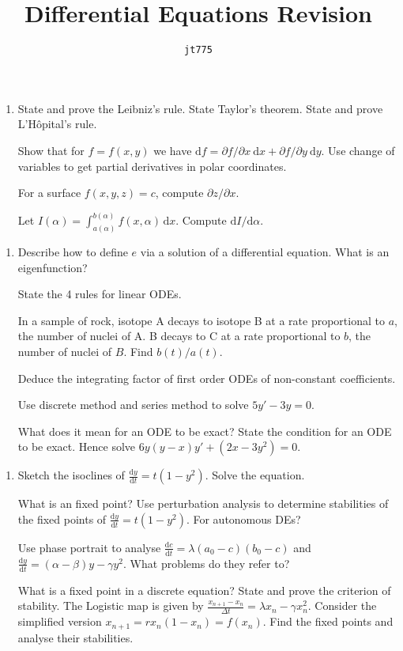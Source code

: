 \documentclass[11pt]{article}
\title{\textbf{Differential Equations Revision}}
\author{\texttt{jt775}}
\date{\null}
\newcommand{\rmd}{\mathrm{d}}
\newlength{\qspace}
\newcounter{qnumber}
\newenvironment{question}%
 {\vspace{\qspace}
  \begin{enumerate}[\bfseries 1\quad][10]%
    \setcounter{enumi}{\value{qnumber}}%
    \item%
 }
{
  \end{enumerate}
  \filbreak
  \stepcounter{qnumber}
 }
\begin{document}
\maketitle
\vspace{-1.5cm}
\begin{question}
    State and prove the Leibniz's rule. State Taylor's theorem. State and prove L'H\^{o}pital's rule.

    Show that for $ f=f(x,y) $ we have $ \rmd f=\partial f/\partial x\ \rmd x+\partial f/\partial y\ \rmd y  $. Use change of variables to get partial derivatives in polar coordinates.

    For a surface $ f(x,y,z)=c $, compute $ \partial z/\partial x  $.

    Let $ I(\alpha) = \int_{a(\alpha)}^{b(\alpha)} f(x,\alpha) \,\mathrm{d}x$. Compute $ \rmd I/ \rmd \alpha  $.
\end{question}
\begin{question}
  Describe how to define $e$ via a solution of a differential equation. What is an eigenfunction?

  State the 4 rules for linear ODEs.

  In a sample of rock, isotope A decays to isotope B at a rate proportional to $a$, the number of nuclei of A. B decays to C at a rate proportional to $b$, the number of nuclei of $B$. Find $b(t)/a(t)$.

  Deduce the integrating factor of first order ODEs of non-constant coefficients.

  Use discrete method and series method to solve $ 5y'-3y=0 $.

  What does it mean for an ODE to be exact? State the condition for an ODE to be exact. Hence solve $ 6y(y-x)y'+(2x-3y^2)=0 $.
\end{question}
\begin{question}
  Sketch the isoclines of $ \frac{\mathrm{d}y}{\mathrm{d}t}=t(1-y^2) $. Solve the equation.

  What is an fixed point? Use perturbation analysis to determine stabilities of the fixed points of $ \frac{\mathrm{d}y}{\mathrm{d}t}=t(1-y^2) $. For autonomous DEs?

  Use phase portrait to analyse $ \frac{\mathrm{d}c}{\mathrm{d}t}=\lambda(a_0-c)(b_0-c)  $ and $ \frac{\mathrm{d}y}{\mathrm{d}t} =(\alpha-\beta)y-\gamma y^2 $. What problems do they refer to?

  What is a fixed point in a discrete equation? State and prove the criterion of stability. The Logistic map is given by $ \frac{x_{n+1}-x_n}{\Delta t}=\lambda x_n-\gamma x_{n}^2 $. Consider the simplified version $ x_{n+1}=rx_n(1-x_n)=f(x_n) $. Find the fixed points and analyse their stabilities.
\end{question}
\end{document}
